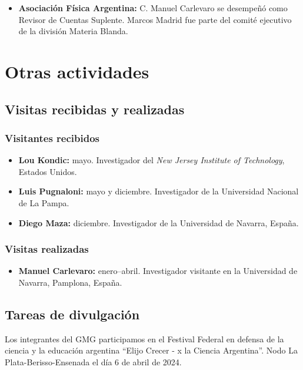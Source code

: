 \documentclass[a4paper,11pt,twoside,final,titlepage,onecolumn,openright]{report}
\begin{document}
\begin{itemize}
\item \textbf{Asociación Física Argentina:} C. Manuel Carlevaro se desempeñó como Revisor de Cuentas Suplente. Marcos Madrid fue parte del comité ejecutivo de la división Materia Blanda.
 
\end{itemize}


\section{Otras actividades}

\subsection{Visitas recibidas y realizadas}

\subsubsection{Visitantes recibidos}

\begin{itemize}
 \item \textbf{Lou Kondic:} mayo. Investigador del \textit{New Jersey Institute of Technology}, Estados Unidos.
 \item {\bf Luis Pugnaloni:} mayo y diciembre. Investigador de la Universidad Nacional de La Pampa.
 \item {\bf Diego Maza:} diciembre. Investigador de la Universidad de Navarra, España.
\end{itemize}

\subsubsection{Visitas realizadas}
 
 \begin{itemize}
  \item {\bf Manuel Carlevaro:} enero--abril. Investigador visitante en la Universidad de Navarra, Pamplona, España.
 \end{itemize}


\subsection{Tareas de divulgación}

Los integrantes del GMG participamos en el Festival Federal en defensa de la ciencia y la educación argentina  “Elijo Crecer - x la Ciencia Argentina”. Nodo La Plata-Berisso-Ensenada el día 6 de abril de 2024.
\end{document}
